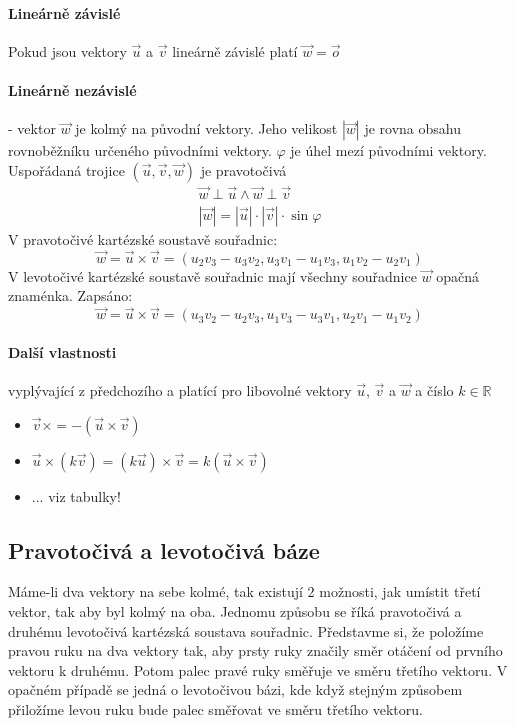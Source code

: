 \documentclass[12pt]{article}
\begin{document}
\paragraph{Lineárně závislé} Pokud jsou vektory $\vec{u}$ a $\vec{v}$ lineárně závislé platí $\vec{w} = \vec{o}$
\paragraph{Lineárně nezávislé} - vektor $\vec{w}$ je kolmý na původní vektory. Jeho velikost $|\vec{w}|$ je rovna obsahu rovnoběžníku určeného původními vektory. $\varphi$ je úhel mezí původními vektory. Uspořádaná trojice $\left(\vec{u}, \vec{v}, \vec{w} \right)$ je pravotočivá
\begin{align}
\vec{w} \perp \vec{u} \land  \vec{w} \perp \vec{v}\\
|\vec{w}| = |\vec{u}| \cdot |\vec{v}| \cdot \sin \varphi
\end{align}
V pravotočivé kartézské soustavě souřadnic:
\begin{equation}
\vec{w} = \vec{u} \times \vec{v} = \left( u_2 v_3 - u_3 v_2 ,u_3 v_1 - u_1 v_3, u_1 v_2 -u_2 v_1 \right)
\end{equation}
V levotočivé kartézské soustavě souřadnic mají všechny souřadnice $\vec{w}$ opačná znaménka. Zapsáno:
\begin{equation}
\vec{w} = \vec{u} \times \vec{v} = \left( u_3 v_2 -u_2 v_3 , u_1 v_3 - u_3 v_1, u_2 v_1 - u_1 v_2  \right)
\end{equation}
\paragraph{Další vlastnosti} vyplývající z předchozího a platící pro libovolné vektory $\vec{u}$, $\vec{v}$ a $\vec{w}$ a číslo $k \in \mathbb{R}$
\begin{itemize}
\item $ \vec{v} \times = - (\vec{u} \times \vec{v})$
\item $ \vec{u} \times (k\vec{v}) = (k\vec{u}) \times \vec{v} = k  (\vec{u} \times \vec{v})$
\item ... viz tabulky!
\end{itemize}

\subsection{Pravotočivá a levotočivá báze}
Máme-li dva vektory na sebe kolmé, tak existují 2 možnosti, jak umístit třetí vektor, tak aby byl kolmý na oba. Jednomu způsobu se říká pravotočivá a druhému levotočivá kartézská soustava souřadnic. Představme si, že položíme pravou ruku na dva vektory tak, aby prsty ruky značily směr otáčení od prvního vektoru k druhému. Potom palec pravé ruky směřuje ve směru třetího vektoru. V opačném případě se jedná o levotočivou bázi, kde když stejným způsobem přiložíme levou ruku bude palec směřovat ve směru třetího vektoru.
\end{document}

